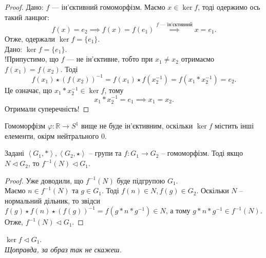 \documentclass{math_library}
\begin{document}
\begin{proof}
\rightproof Дано: $f$ --- ін'єктивний гомоморфізм. Маємо $x \in \ker f$, тоді одержимо ось такий ланцюг:
\[
f(x) = e_2 \implies f(x) = f(e_1) \overset{f \text{ --- ін'єктивний}}{\implies} x = e_1.
\]
Отже, одержали $\ker f = \{e_1\}$.
\bigskip \\
\leftproof Дано: $\ker f = \{e_1\}$.\\
!Припустимо, що $f$ --- не ін'єктивне, тобто при $x_1 \neq x_2$ отримаємо $f(x_1) = f(x_2)$. Тоді
\[ f(x_1)\star(f(x_2))^{-1} = f(x_1) \star f(x_2^{-1}) = f(x_1 * x_2^{-1}) = e_2.
\]
Це означає, що $x_1*x_2^{-1} \in \ker f$, тому 
\[
x_1*x_2^{-1} = e_1 \implies x_1 = x_2.
\]
Отримали суперечність!
\end{proof}

\begin{example}
Гомоморфізм $\varphi \colon \mathbb{R} \to S^1$ вище не буде ін'єктивним, оскільки $\ker f$ містить інші елементи, окірм нейтрального $0$.
\end{example}

\iffalse
\begin{proposition}
Задані $\left<G_1, * \right>,\left<G_2, \star \right>$ -- групи та $f \colon G_1 \to G_2$ -- гомоморфізм. Тоді якщо $N \triangleleft G_2$, то $f^{-1}(N) \triangleleft G_1$.
\end{proposition}

\begin{proof}
Уже доводили, що $f^{-1}(N)$ буде підгрупою $G_1$.\\
Маємо $n \in f^{-1}(N)$ та $g \in G_1$. Тоді $f(n) \in N, f(g) \in G_2$. Оскільки $N$ -- нормальний дільник, то звідси $f(g) \star f(n) \star (f(g))^{-1} = f(g*n*g^{-1}) \in N$, а тому $g*n*g^{-1} \in f^{-1}(N)$.\\
Отже, $f^{-1}(N) \triangleleft G_1$.
\end{proof}

\begin{corollary}
$\ker f \triangleleft G_1$.\\
\textit{Щоправда, за образ так не скажеш.}
\end{corollary}
\end{document}
